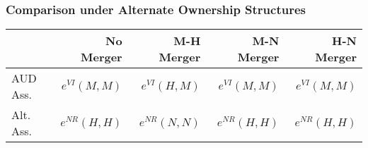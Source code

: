\begin{frame}
\frametitle{Comparison under Alternate Ownership Structures}
\begin{table}[htbp]
  \begin{center}
  \label{tab:merger}
    \begin{tabular}{|l | rrrr|}
\hline
          & No Merger & M-H Merger & M-N Merger & H-N Merger \\
\hline
     AUD Ass. & $e^{VI}(M,M)$ & $e^{VI}(H,M)$ & $e^{VI}(M,M)$ & $e^{VI}(M,M)$ \\
    Alt. Ass. & $e^{NR}(H,H)$ &  $e^{NR}(N,N)$ &  $e^{NR}(H,H)$ &  $e^{NR}(H,H)$ \\
    \hline
 

\end{tabular}
\end{center}
\end{table}
\end{frame}
